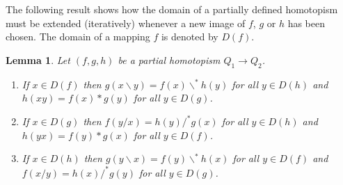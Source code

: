 \documentclass{amsart}
\def\rdiv{/}
\def\ldiv{\backslash}
\def\isordiv{/^*}
\def\isoldiv{\backslash^*}
\theoremstyle{plain}
\newtheorem{lemma}[theorem]{Lemma}
\theoremstyle{definition}
\begin{document}
The following result shows how the domain of a partially defined homotopism must be extended (iteratively) whenever a new image of $f$, $g$ or $h$ has been chosen. The domain of a mapping $f$ is denoted by $D(f)$.

\begin{lemma}
Let $(f,g,h)$ be a partial homotopism $Q_1\to Q_2$.
\begin{enumerate}
\item[(i)] If $x\in D(f)$ then $g(x\ldiv y) = f(x)\isoldiv h(y)$ for all $y\in D(h)$ and $h(xy) = f(x)*g(y)$ for all $y\in D(g)$.
\item[(ii)] If $x\in D(g)$ then $f(y\rdiv x) = h(y)\isordiv g(x)$ for all $y\in D(h)$ and $h(yx) = f(y)*g(x)$ for all $y\in D(f)$.
\item[(iii)] If $x\in D(h)$ then $g(y\ldiv x) =f(y)\isoldiv h(x)$ for all $y\in D(f)$ and $f(x\rdiv y) = h(x)\isordiv g(y)$ for all $y\in D(g)$.
\end{enumerate}
\end{lemma}
\end{document}
